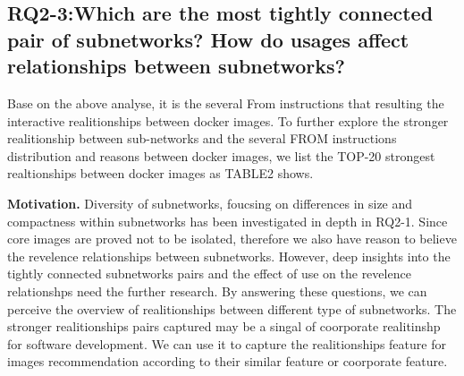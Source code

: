 \documentclass[sigconf]{acmart}
\begin{document}






















\subsection{RQ2-3:Which are the most tightly connected pair of subnetworks? How do usages affect relationships between subnetworks?}
Base on the above analyse, it is the several From instructions that resulting the interactive realitionships between docker images. To further explore the stronger realitionship between sub-networks and the several FROM instructions distribution and reasons between docker images, we list the TOP-20 strongest realtionships between docker images as TABLE2 shows.


\noindent\textbf{Motivation. }
Diversity of subnetworks, foucsing on differences in size and compactness within subnetworks has been  investigated in depth in RQ2-1. Since core images are proved not to be isolated, therefore we also have reason to believe the revelence relationships between subnetworks.  However, deep insights into the tightly connected subnetworks pairs and the effect of use on the revelence relationshps need the further research. By answering these questions, we can perceive the overview of realitionships between different type of subnetworks. The stronger realitionships pairs captured may be a singal of coorporate realitinshp for software development. We can use it to capture the realitionships feature for images recommendation according to their similar feature or coorporate feature.
\end{document}
